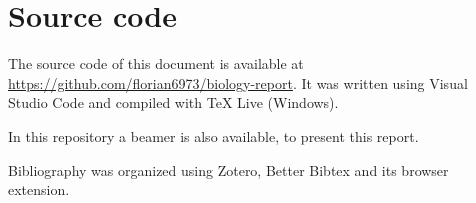 \documentclass{article}
\begin{document}

    \clearpage
    
    \nocite{*}
    \printbibliography

    \clearpage

    \appendix

    \section {Source code}
        The source code of this document is available at \url{https://github.com/florian6973/biology-report}.
        It was written using Visual Studio Code and compiled with TeX Live (Windows).

        In this repository a beamer is also available, to present this report.

        Bibliography was organized using Zotero, Better Bibtex and its browser extension.
\end{document}
